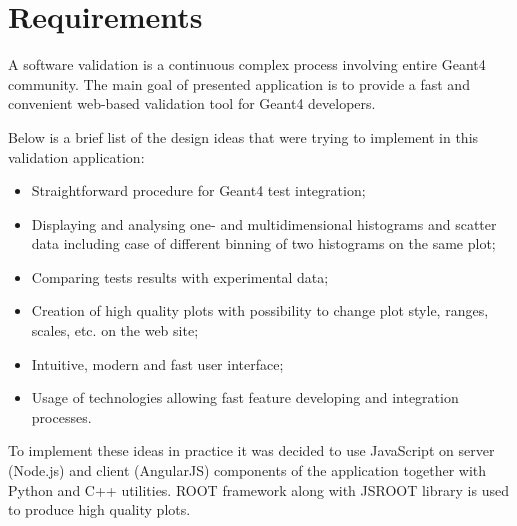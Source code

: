\section{Requirements}
\label{sec:requirements}

A software validation is a continuous complex process involving entire Geant4 community. The main goal of presented application is to provide a fast and convenient web-based validation tool for Geant4 developers.

Below is a brief list of the design ideas that were trying to implement in this validation application:
\begin{itemize}
    \item Straightforward procedure for Geant4 test integration;
    \item Displaying and analysing one- and multidimensional histograms and scatter data including case of different binning of two histograms on the same plot;
    \item Comparing tests results with experimental data;
    \item Creation of high quality plots with possibility to change plot style, ranges, scales, etc. on the web site;
    \item Intuitive, modern and fast user interface;
    \item Usage of technologies allowing fast feature developing and integration processes.
\end{itemize}

To implement these ideas in practice it was decided to use JavaScript on server (Node.js) and client (AngularJS) components of the application together with Python and C++ utilities. ROOT framework along with JSROOT library is used to produce high quality plots.

